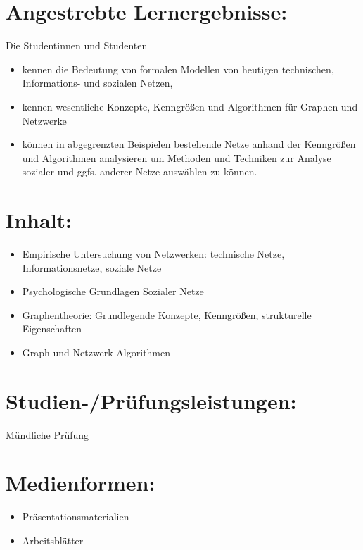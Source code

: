 \section*{Angestrebte
Lernergebnisse:}\label{angestrebte-lernergebnisse-17}

Die Studentinnen und Studenten

\begin{itemize}
\item
  kennen die Bedeutung von formalen Modellen von heutigen technischen,
  Informations- und sozialen Netzen,
\item
  kennen wesentliche Konzepte, Kenngrößen und Algorithmen für Graphen
  und Netzwerke
\item
  können in abgegrenzten Beispielen bestehende Netze anhand der
  Kenngrößen und Algorithmen analysieren um Methoden und Techniken zur
  Analyse sozialer und ggfs. anderer Netze auswählen zu können.
\end{itemize}

\section*{Inhalt:}\label{inhalt-17}

\begin{itemize}
\item
  Empirische Untersuchung von Netzwerken: technische Netze,
  Informationsnetze, soziale Netze
\item
  Psychologische Grundlagen Sozialer Netze
\item
  Graphentheorie: Grundlegende Konzepte, Kenngrößen, strukturelle
  Eigenschaften
\item
  Graph und Netzwerk Algorithmen
\end{itemize}

\section*{Studien-/Prüfungsleistungen:}\label{studien-pruxfcfungsleistungen-17}

Mündliche Prüfung

\section*{Medienformen:}\label{medienformen-17}

\begin{itemize}
\item
  Präsentationsmaterialien
\item
  Arbeitsblätter
\end{itemize}

